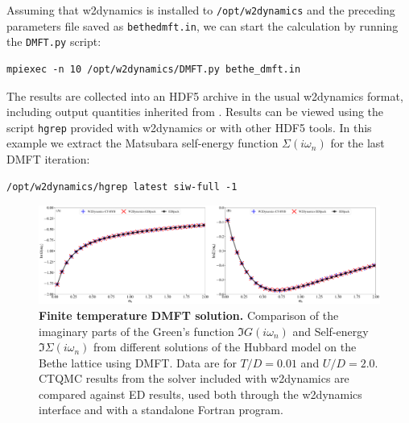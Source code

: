 \documentclass[edipack2.tex]{subfiles}
\begin{document}
Assuming that w2dynamics is installed to {\tt /opt/w2dynamics} and the preceding parameters file saved as {\tt bethe\textunderscore{}dmft.in}, we can start the calculation by running the {\tt DMFT.py} script:
\begin{lstlisting}[style=mybash,numbers=none]
mpiexec -n 10 /opt/w2dynamics/DMFT.py bethe_dmft.in
\end{lstlisting}

The results are collected into an HDF5 archive in the usual w2dynamics format, including output quantities inherited from \NAME. Results can be viewed using the script {\tt hgrep} provided with w2dynamics or with other HDF5 tools. In this example we extract the Matsubara self-energy function $\Sigma(i\omega_n)$ for the last DMFT iteration:
\begin{lstlisting}[style=mybash,numbers=none]
/opt/w2dynamics/hgrep latest siw-full -1
\end{lstlisting}

\begin{figure}%
  \includegraphics[width=\linewidth]{figures/figBetheW2D.pdf}
    \caption{\label{figEx1W}%
    \textbf{Finite temperature DMFT solution.}
    Comparison of the imaginary parts of the Green's function $\Im{G}(i\omega_n)$ and Self-energy $\Im{\Sigma}(i\omega_n)$ from different solutions of the Hubbard model on the Bethe lattice using DMFT. Data are for $T/D=0.01$ and $U/D=2.0$. CTQMC results from the solver included with w2dynamics are compared against \NAME ED results, used both through the w2dynamics interface and with a standalone Fortran program. 
        }
\end{figure}
\end{document}
